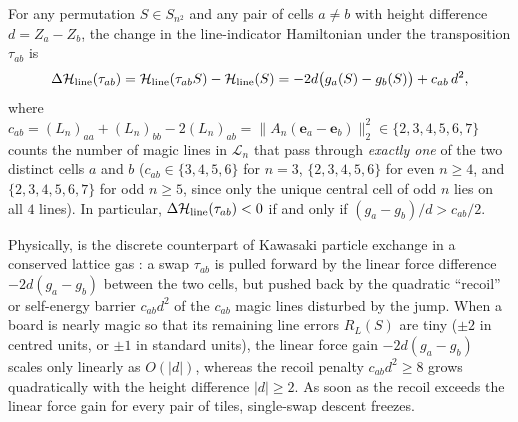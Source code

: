 \begin{lemma}
\label{lem:swap_law}
For any permutation $S \in S_{n^2}$ and any pair of cells $a \ne b$ with height difference $d = Z_a - Z_b$, the change in the line-indicator Hamiltonian under the transposition $\tau_{ab}$ is
\begin{equation}
  \Delta\mathcal{H}_{\mathrm{line}}(\tau_{ab}) = \mathcal{H}_{\mathrm{line}}(\tau_{ab} S) - \mathcal{H}_{\mathrm{line}}(S) = -2d\bigl(g_a(S) - g_b(S)\bigr) + c_{ab}\,d^2,
  \label{eq:exact_swap_delta}
\end{equation}
where $c_{ab} = (L_n)_{aa} + (L_n)_{bb} - 2(L_n)_{ab} = \|A_n(\mathbf{e}_a - \mathbf{e}_b)\|_2^2 \in \{2,3,4,5,6,7\}$ counts the number of magic lines in $\mathcal{L}_n$ that pass through \emph{exactly one} of the two distinct cells $a$ and $b$ ($c_{ab} \in \{3,4,5,6\}$ for $n=3$, $\{2,3,4,5,6\}$ for even $n \ge 4$, and $\{2,3,4,5,6,7\}$ for odd $n \ge 5$, since only the unique central cell of odd $n$ lies on all $4$ lines). In particular, $\Delta\mathcal{H}_{\mathrm{line}}(\tau_{ab}) < 0$ if and only if $(g_a - g_b)/d > c_{ab}/2$.
\end{lemma}

Physically,  is the discrete counterpart of Kawasaki particle exchange in a conserved lattice gas \cite{kawasaki1966diffusion}: a swap $\tau_{ab}$ is pulled forward by the linear force difference $-2d(g_a - g_b)$ between the two cells, but pushed back by the quadratic ``recoil'' or self-energy barrier $c_{ab}d^2$ of the $c_{ab}$ magic lines disturbed by the jump. When a board is nearly magic so that its remaining line errors $R_L(S)$ are tiny ($\pm 2$ in centred units, or $\pm 1$ in standard units), the linear force gain $-2d(g_a - g_b)$ scales only linearly as $O(|d|)$, whereas the recoil penalty $c_{ab}d^2 \ge 8$ grows quadratically with the height difference $|d| \ge 2$. As soon as the recoil exceeds the linear force gain for every pair of tiles, single-swap descent freezes.

